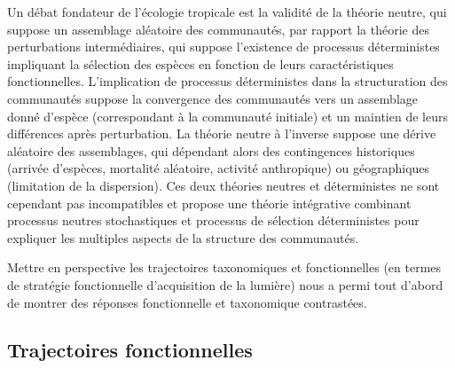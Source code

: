 \documentclass[
  11pt,
  french,
  A4paper,
  extrafontsizes,onecolumn,openright
  ]{memoir}
\begin{document}
Un débat fondateur de l'écologie tropicale est la validité de la théorie
neutre, qui suppose un assemblage aléatoire des communautés, par rapport
la théorie des perturbations intermédiaires, qui suppose l'existence de
processus déterministes impliquant la sélection des espèces en fonction
de leurs caractéristiques fonctionnelles. L'implication de processus
déterministes dans la structuration des communautés suppose la
convergence des communautés vers un assemblage donné d'espèce
(correspondant à la communauté initiale) et un maintien de leurs
différences après perturbation. La théorie neutre à l'inverse suppose
une dérive aléatoire des assemblages, qui dépendant alors des
contingences historiques (arrivée d'espèces, mortalité aléatoire,
activité anthropique) ou géographiques (limitation de la dispersion).
Ces deux théories neutres et déterministes ne sont cependant pas
incompatibles et \autocite{Chave2004} propose une théorie intégrative
combinant processus neutres stochastiques et processus de sélection
déterministes pour expliquer les multiples aspects de la structure des
communautés.

Mettre en perspective les trajectoires taxonomiques et fonctionnelles
(en termes de stratégie fonctionnelle d'acquisition de la lumière) nous
a permi tout d'abord de montrer des réponses fonctionnelle et
taxonomique contrastées.

\subsection{Trajectoires
fonctionnelles}\label{trajectoires-fonctionnelles}
\end{document}
